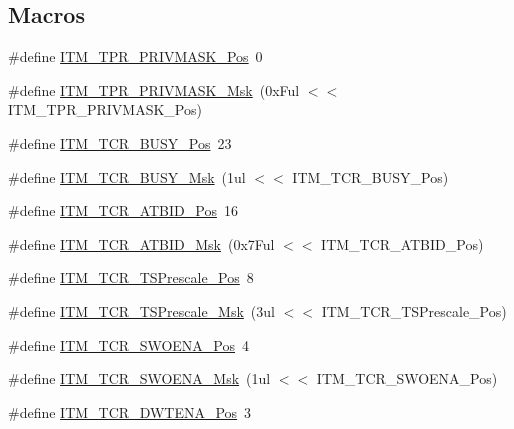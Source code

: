 \subsection*{Macros}
\begin{DoxyCompactItemize}
\item 
\#define \hyperlink{group__CMSIS__CM3__ITM_ga7abe5e590d1611599df87a1884a352e8}{I\+T\+M\+\_\+\+T\+P\+R\+\_\+\+P\+R\+I\+V\+M\+A\+S\+K\+\_\+\+Pos}~0
\item 
\#define \hyperlink{group__CMSIS__CM3__ITM_ga168e089d882df325a387aab3a802a46b}{I\+T\+M\+\_\+\+T\+P\+R\+\_\+\+P\+R\+I\+V\+M\+A\+S\+K\+\_\+\+Msk}~(0x\+Ful $<$$<$ I\+T\+M\+\_\+\+T\+P\+R\+\_\+\+P\+R\+I\+V\+M\+A\+S\+K\+\_\+\+Pos)
\item 
\#define \hyperlink{group__CMSIS__CM3__ITM_ga9174ad4a36052c377cef4e6aba2ed484}{I\+T\+M\+\_\+\+T\+C\+R\+\_\+\+B\+U\+S\+Y\+\_\+\+Pos}~23
\item 
\#define \hyperlink{group__CMSIS__CM3__ITM_ga43ad7cf33de12f2ef3a412d4f354c60f}{I\+T\+M\+\_\+\+T\+C\+R\+\_\+\+B\+U\+S\+Y\+\_\+\+Msk}~(1ul $<$$<$ I\+T\+M\+\_\+\+T\+C\+R\+\_\+\+B\+U\+S\+Y\+\_\+\+Pos)
\item 
\#define \hyperlink{group__CMSIS__CM3__ITM_gad5a179af7ad1f2b8958e50907186529b}{I\+T\+M\+\_\+\+T\+C\+R\+\_\+\+A\+T\+B\+I\+D\+\_\+\+Pos}~16
\item 
\#define \hyperlink{group__CMSIS__CM3__ITM_ga491d8bddbe6c0523ff10ef6d2846f0f2}{I\+T\+M\+\_\+\+T\+C\+R\+\_\+\+A\+T\+B\+I\+D\+\_\+\+Msk}~(0x7\+Ful $<$$<$ I\+T\+M\+\_\+\+T\+C\+R\+\_\+\+A\+T\+B\+I\+D\+\_\+\+Pos)
\item 
\#define \hyperlink{group__CMSIS__CM3__ITM_gad7bc9ee1732032c6e0de035f0978e473}{I\+T\+M\+\_\+\+T\+C\+R\+\_\+\+T\+S\+Prescale\+\_\+\+Pos}~8
\item 
\#define \hyperlink{group__CMSIS__CM3__ITM_ga7a723f71bfb0204c264d8dbe8cc7ae52}{I\+T\+M\+\_\+\+T\+C\+R\+\_\+\+T\+S\+Prescale\+\_\+\+Msk}~(3ul $<$$<$ I\+T\+M\+\_\+\+T\+C\+R\+\_\+\+T\+S\+Prescale\+\_\+\+Pos)
\item 
\#define \hyperlink{group__CMSIS__CM3__ITM_ga7a380f0c8078f6560051406583ecd6a5}{I\+T\+M\+\_\+\+T\+C\+R\+\_\+\+S\+W\+O\+E\+N\+A\+\_\+\+Pos}~4
\item 
\#define \hyperlink{group__CMSIS__CM3__ITM_ga97476cb65bab16a328b35f81fd02010a}{I\+T\+M\+\_\+\+T\+C\+R\+\_\+\+S\+W\+O\+E\+N\+A\+\_\+\+Msk}~(1ul $<$$<$ I\+T\+M\+\_\+\+T\+C\+R\+\_\+\+S\+W\+O\+E\+N\+A\+\_\+\+Pos)
\item 
\#define \hyperlink{group__CMSIS__CM3__ITM_ga30e83ebb33aa766070fe3d1f27ae820e}{I\+T\+M\+\_\+\+T\+C\+R\+\_\+\+D\+W\+T\+E\+N\+A\+\_\+\+Pos}~3
$$
\end{DoxyCompactItemize}
